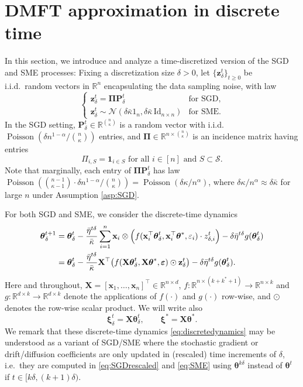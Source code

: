 \documentclass[11pt,letterpaper,reqno]{amsart}
\theoremstyle{definition}
\def\eps{\varepsilon}
\def\R{\mathbb{R}}
\def\Pois{\operatorname{Poisson}}
\def\Id{\mathrm{Id}}
\def\cS{\mathcal{S}}
\def\cN{\mathcal{N}}
\def\x{\mathbf{x}}
\def\z{\mathbf{z}}
\def\bP{\mathbf{P}}
\def\X{\mathbf{X}}
\def\1{\mathbf{1}}
\def\beps{\boldsymbol{\varepsilon}}
\def\btheta{\boldsymbol{\theta}}
\def\bxi{\boldsymbol{\xi}}
\def\bPi{\boldsymbol{\Pi}}
\begin{document}
\section{DMFT approximation in discrete time}

In this section, we introduce and analyze
a time-discretized version of the SGD and SME
processes: Fixing a discretization size $\delta>0$, let $\{\z_\delta^t\}_{t
\geq 0}$ be i.i.d.\ random vectors in $\R^n$ encapsulating the data sampling
noise, with law
\[\begin{cases}
\z_\delta^t=\bPi \bP_\delta^t & \text{for SGD},\\
\z_\delta^t \sim
\cN(\delta \bar\kappa1_n,\delta\bar\kappa\,\Id_{n\times n}) & \text{for SME}.
\end{cases}\]
In the SGD setting, $\bP_\delta^t \in \R^{{n\choose \kappa}}$ is a random vector
with i.i.d.\ $\Pois(\delta n^{1-\alpha} / {n\choose\kappa})$ entries,
and $\bPi\in\R^{n\times {n\choose \kappa}}$ is an incidence matrix having
entries
\[\Pi_{i,S}=\1_{i \in S} \text{ for all $i \in [n]$ and $S \subset \cS$}.\]
Note that marginally, each entry of $\bPi\bP_\delta^t$ has law
$\Pois(\binom{n-1}{\kappa-1} \cdot \delta n^{1-\alpha} /
{n\choose\kappa})=\Pois(\delta \kappa/n^\alpha)$,
where $\delta \kappa/n^\alpha \approx \delta\bar\kappa$
for large $n$ under Assumption \ref{asp:SGD}.

For both SGD and SME, we consider the discrete-time dynamics
\begin{align}
{\btheta}_\delta^{t+1}&={\btheta}_\delta^{t}
-\frac{\bar\eta^{t\delta}}{\bar\kappa}
\sum_{i=1}^n \x_i \otimes \Big(f(\x_i^\top \btheta_\delta^t,\x_i^\top
\btheta^*,\eps_i) \cdot z_{\delta,i}^t\Big)
-\delta\bar\eta^{t\delta} g(\btheta_\delta^t)\notag\\
&={\btheta}_\delta^{t}
-\frac{\bar\eta^{t\delta}}{\bar\kappa} \X^\top \big(f(\X \btheta_\delta^t,
\X\btheta^*,\beps) \odot \z_\delta^t\big)
- \delta\bar\eta^{t\delta} g({\btheta}_\delta^{t}).\label{eq:discretedynamics}
\end{align}
Here and throughout, $\X=[\x_1,\ldots,\x_n]^\top \in \R^{n \times d}$,
$f:\R^{n \times (k+k^*+1)} \to \R^{n \times k}$
and $g:\R^{d \times k} \to \R^{d \times k}$ denote the applications of
$f(\cdot)$ and $g(\cdot)$ row-wise, and $\odot$ denotes the row-wise
scalar product. We will write also
\[{\bxi}_\delta^{t}=\X {\btheta}_\delta^{t},
\qquad \bxi^*=\X \btheta^*.\]
We remark that these discrete-time dynamics \eqref{eq:discretedynamics}
may be understood as a variant of SGD/SME where the stochastic
gradient or drift/diffusion coefficients are only updated in (rescaled) time
increments of $\delta$, i.e.\ they are computed in \eqref{eq:SGDrescaled}
and \eqref{eq:SME} using $\btheta^{k\delta}$ instead of $\btheta^t$ if $t
\in [k\delta,(k+1)\delta)$.
\end{document}
